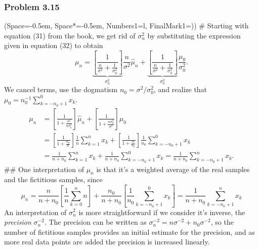 \documentclass[12pt, a4paper]{article}
\newcommand{\listSpace}{-0.5em}%
\begin{document}
\subsubsection*{Problem 3.15}
\begin{easylist}[enumerate]
\ListProperties(Space=\listSpace, Space*=\listSpace, Numbers1=l, FinalMark1={)})
# Starting with equation (31) from the book, we get rid of $\sigma_n^2$ by substituting the expression given in equation (32) to obtain
\begin{equation*}
\mu_n =
\underbrace{ \left[ \frac{1}{\frac{n}{\sigma^2} + \frac{1}{\sigma_0^2}} \right]}_{\sigma^2_n}
\frac{n}{\sigma^2} \hat{\mu}_n + 
\underbrace{ \left[ \frac{1}{\frac{n}{\sigma^2} + \frac{1}{\sigma_0^2}} \right]}_{\sigma^2_n}
\frac{\mu_0}{\sigma_0^2}.
\end{equation*}
We cancel terms, use the dogmatism $n_0 = \sigma^2 / \sigma_0^2$, and realize that $\mu_0 = n_0^{-1} \sum_{k = -n_0 + 1}^{0} x_k$.
\begin{align*}
\mu_n &= \left[ \frac{1}{1 + \frac{\sigma^2}{n \sigma_0^2}}  \right]
\hat{\mu}_n + 
\left[ \frac{1}{1 + \frac{n \sigma_0^2}{\sigma^2}} \right] \mu_0 \\
&= \left[ \frac{1}{1 + \frac{n_0}{n}}  \right]
\frac{1}{n} \sum_{k = 1}^{n} x_k
+ 
\left[ \frac{1}{1 + \frac{n}{n_0}} \right]
 \frac{1}{n_0} \sum_{k = -n_0 + 1}^{0} x_k
 \\
 &= \frac{1}{n + n_0} \sum_{k = 1}^{n} x_k + 
 \frac{1}{n + n_0} \sum_{k = -n_0 + 1}^{0} x_k = 
 \frac{1}{n + n_0} \sum_{k = -n_0 + 1}^{n} x_k.
\end{align*}
## One interpretation of $\mu_n$ is that it's a weighted average of the real samples and the fictitious samples, since
\begin{equation*}
	\mu_n = 
	\frac{n}{n + n_0} \left[ \frac{1}{n} \sum_{k = 0}^{n} n \right] 
	+
	\frac{n_0}{n + n_0} \left[ \frac{1}{n_0} \sum_{k = -n_0 + 1}^{0} x_k \right] = 
	\frac{1}{n + n_0} \sum_{k = -n_0 + 1}^{n} x_k
\end{equation*}
An interpretation of $\sigma_n^2$ is more straightforward if we consider it's inverse, the \emph{precision} $\sigma_n^{-2}$.
The precision can be written as $\sigma_n^{-2} = n \sigma^{-2} + n_0 \sigma^{-2}$, so the number of fictitious samples provides an initial estimate for the precision, and as more real data points are added the precision is increased linearly.
	
\end{easylist}
\end{document}
